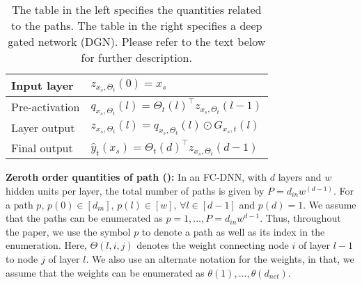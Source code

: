 \begin{table}[!htb]
\begin{minipage}{0.5\columnwidth}
{\begin{tabular}{|l|l|}
Input layer & $z_{x_s,\Theta_t}(0)=x_s$ \\\hline
Pre-activation & $q_{x_s,\Theta_t}(l)={\Theta_t(l)}^\top z_{x_s,\Theta_t}(l-1)$\\\hline
Layer output & $z_{x_s,\Theta_t}(l)=q_{x_s,\Theta_t}(l)\odot G_{x_s,t}(l)$ \\\hline
Final output & $\hat{y}_t(x_s)={\Theta_t(d)}^\top z_{x_s,\Theta_t}(d-1)$\\\hline
\end{tabular}
}
\end{minipage}
\caption{The table in the left specifies the quantities related to the paths. The table in the right specifies a deep gated network (DGN).  Please refer to the text below for further description.}
\label{tb:dgn-path}
\end{table}
\textbf{Zeroth order quantities of path ():} In an FC-DNN, with $d$ layers and $w$ hidden units per layer, the total number of paths is given by $P=d_{in}w^{(d-1)}$. For a path $p$, $p(0)\in [d_{in}]$, $p(l)\in[w],\,\forall l\in[d-1]$ and $p(d)=1$. We assume that the paths can be enumerated as $p=1,\ldots, P = d_{in}w^{d-1}$. Thus, throughout the paper, we use the symbol $p$ to denote a path as well as its index in the enumeration. Here, $\Theta(l,i,j)$ denotes the weight connecting node $i$ of layer $l-1$ to node $j$ of layer $l$. We also use an alternate notation for the weights, in that, we assume that the weights can be enumerated as $\theta(1),\ldots,\theta(d_{net})$. 

